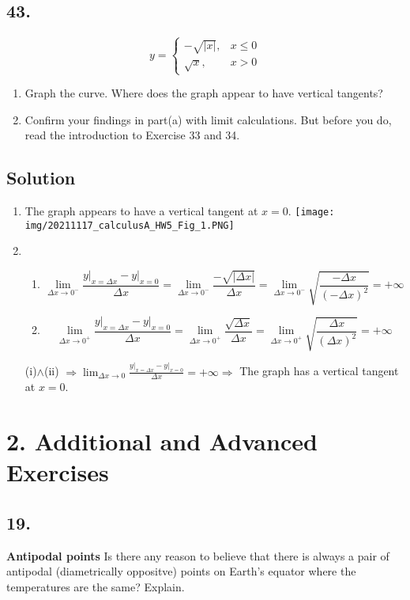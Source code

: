 \documentclass{article}
\begin{document}
\subsection*{43.}
\[y=\left\{\begin{array}{ll}
-\sqrt{|x|}, & x\leq 0 \\
\sqrt{x}, & x>0
\end{array}\right.\]
\begin{enumerate} [label=(\alph*)]
    \item Graph the curve. Where does the graph appear to have vertical tangents?
    \item Confirm your findings in part(a) with limit calculations. But before you do, read the introduction to Exercise 33 and 34.
\end{enumerate}
\subsection*{Solution}
\begin{enumerate} [label=(\alph*)]
\item The graph appears to have a vertical tangent at $x=0$.\newline
\texttt{[image: img/20211117\_calculusA\_HW5\_Fig\_1.PNG]}
\item \begin{enumerate}[label=(\roman*)]
    \item 
    \[\lim_{\Delta x\to 0^-} \frac{y\vert _{x=\Delta x}-y\vert _{x=0}}{\Delta x}=\lim_{\Delta x\to 0^-} \frac{-\sqrt{|\Delta x|}}{\Delta x}=\lim_{\Delta x\to 0^-} \sqrt{\frac{-\Delta x}{(-\Delta x)^2}}=+\infty\]
    \item
    \[\lim_{\Delta x\to 0^+} \frac{y\vert _{x=\Delta x}-y\vert _{x=0}}{\Delta x}=\lim_{\Delta x\to 0^+} \frac{\sqrt{\Delta x}}{\Delta x}=\lim_{\Delta x\to 0^+} \sqrt{\frac{\Delta x}{(\Delta x)^2}}=+\infty\]
\end{enumerate}
(i)$\land$(ii) $\Rightarrow \lim_{\Delta x\to 0} \frac{y\vert _{x=\Delta x}-y\vert _{x=0}}{\Delta x}=+\infty\Rightarrow$ The graph has a vertical tangent at $x=0$.
\end{enumerate}
\section*{2. Additional and Advanced Exercises}
\subsection*{19.}
\textbf{Antipodal points} Is there any reason to believe that there is always a pair of antipodal (diametrically oppositve) points on Earth's equator where the temperatures are the same? Explain.
\end{document}
